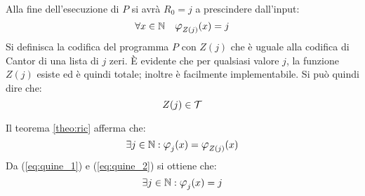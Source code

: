 Alla fine dell'esecuzione di $P$ si avrà $R_0=j$ a prescindere dall'input:
\begin{equation}\label{eq:quine_1}
    \forall x\in\N \quad \semanticaRAM_{Z(j)}(x) = j
\end{equation}
Si definisca la {\color{red}codifica del programma $P$} con $Z(j)$ che è uguale
alla codifica di Cantor di una lista di $j$ zeri. È evidente che per qualsiasi
valore $j$, la funzione $Z(j)$ esiste ed è quindi totale; inoltre è facilmente
implementabile. Si può quindi dire che:
$$Z(j)\in\mathcal{T}$$

Il teorema \ref{theo:ric} afferma che:
\begin{equation}\label{eq:quine_2}
    \exists j\in\N:\semanticaRAM_j(x) = \semanticaRAM_{Z(j)}(x)
\end{equation} 
Da (\ref{eq:quine_1}) e (\ref{eq:quine_2}) si ottiene che:
$$ \exists j\in\N : \semanticaRAM_j(x)= j $$